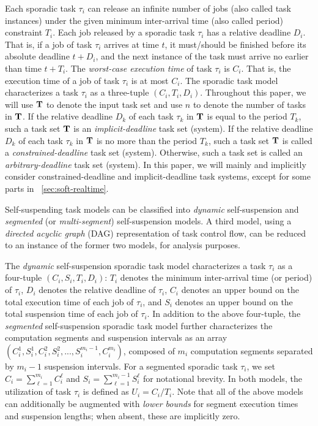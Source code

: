 \label{sec:model}


Each sporadic task $\tau_i$ can release an infinite number of jobs (also called task instances) under the given minimum inter-arrival time (also called period) constraint $T_i$.  Each job released by a sporadic task $\tau_i$ has a relative deadline $D_i$.  That is, if a job of task $\tau_i$ arrives at time $t$, it must/should be finished before its absolute deadline $t+D_i$, and the next instance of the task must arrive no earlier than time $t + T_i$.
The \emph{worst-case execution time} of task $\tau_i$ is $C_i$. That is, the execution time of a job of task $\tau_i$ is at most $C_i$.
The sporadic task model characterizes a task $\tau_i$ as a three-tuple $(C_i,T_i,D_i)$.
Throughout this paper, we will use ${\bf T}$ to denote the input task
set and use $n$ to denote the number of tasks in ${\bf T}$. 
If the relative deadline $D_k$ of each task $\tau_k$ in ${\bf T}$ is 
equal to the period $T_k$, such a task set ${\bf T}$ is an
\emph{implicit-deadline} task set (system). If the relative deadline $D_k$ of
each task $\tau_k$ in ${\bf T}$ is no more than the period $T_k$,
such a task set ${\bf T}$ is called a \emph{constrained-deadline} task
set (system). Otherwise, such a task set is called an \emph{arbitrary-deadline}
task set (system). In this paper, we will mainly and implicitly 
consider constrained-deadline and
implicit-deadline task systems, except for some parts in
\mysectionref{}~\ref{sec:soft-realtime}.
  
Self-suspending task models can be classified into \emph{dynamic} self-suspension and \emph{segmented} (or \emph{multi-segment})
self-suspension models. A third model, using a \emph{directed acyclic graph} (DAG) representation of task control flow, can be 
reduced to an instance of the former two models, for analysis purposes.

The \emph{dynamic} self-suspension sporadic task model characterizes a task $\tau_i$ as a four-tuple $(C_i,S_i,T_i,D_i)$: $T_i$ denotes the 
minimum inter-arrival time (or period) of $\tau_i$, $D_i$ denotes the relative deadline of $\tau_i$, $C_i$ denotes an upper bound on 
the total execution time of each job of $\tau_i$, and $S_i$ denotes an upper bound on the total suspension time of each job of $\tau_i$.  
In addition to the above four-tuple, the \emph{segmented} self-suspension sporadic task model further characterizes the computation segments and suspension 
intervals as an array $(C_{i}^1,S_{i}^1,C_{i}^2,S_{i}^2,...,S_{i}^{m_i-1},C_{i}^{m_i})$, composed of $m_i$ computation segments 
separated by $m_i-1$ suspension intervals.  For a segmented sporadic task $\tau_i$, we set 
$C_i = \sum_{\ell=1}^{m_i} C_i^\ell$ and $S_i=\sum_{\ell=1}^{m_i-1} S_i^\ell$ for notational brevity.
In both models, the
utilization of task $\tau_i$ is defined as $U_i=C_i/T_i$.
Note that all of the above models can additionally be augmented with \emph{lower bounds} for segment execution times and suspension 
lengths; when absent, these are implicitly zero.

